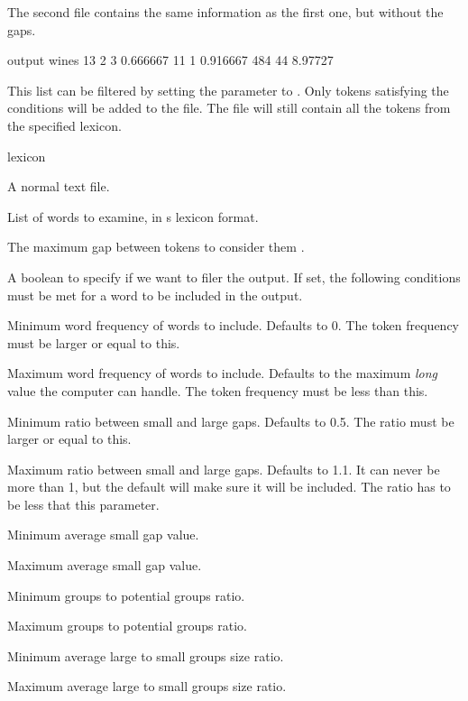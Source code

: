 \documentclass[a4paper,10pt,twoside]{report}
\begin{document}
The second file contains the same information as the first one, but
without the gaps.

\begin{wout}{ output}
wines 13 2 3 0.666667 11 1 0.916667 484 44 8.97727
\end{wout}

This list can be filtered by setting the  parameter to
. Only tokens satisfying the conditions will be added to the
 file. The  file will still contain all the tokens
from the specified lexicon.

\begin{varlist}{lexicon}
\item[filename] A normal text file.
\item[lexicon] List of words to examine, in \wopr{}s lexicon format.
\item[gap] The maximum gap between tokens to consider them
  .
\item[filter] A boolean to specify if we want to filer the 
  output. If set, the following conditions must be met for a word
  to be included in the output.
\item[min\_f] Minimum word frequency of words to include. Defaults to
  0. The token frequency must be larger or equal to this.
\item[max\_f] Maximum word frequency of words to include. Defaults to
  the maximum \emph{long} value the computer can handle. The token
  frequency must be less than this.
\item[min\_r] Minimum ratio between small and large gaps. Defaults to
  0.5. The ratio must be larger or equal to this.
\item[max\_r] Maximum ratio between small and large gaps. Defaults to
  1.1. It can never be more than 1, but the default will make sure it
  will be included. The ratio has to be less that this parameter.
\item[min\_a] Minimum average small gap value.
\item[max\_a] Maximum average small gap value.
\item[min\_p] Minimum groups to potential groups ratio.
\item[max\_p] Maximum groups to potential groups ratio.
\item[min\_g] Minimum average large to small groups size ratio.
\item[max\_g] Maximum average large to small groups size ratio. 
\end{varlist}
\end{document}
